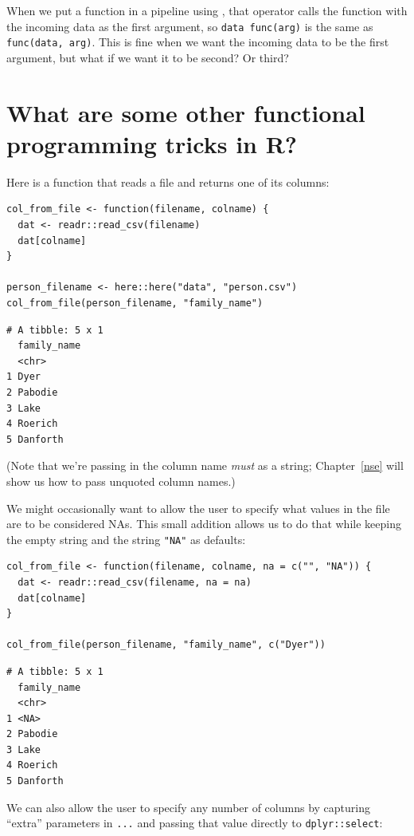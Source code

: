When we put a function in a pipeline using \texttt{\pipe},
that operator calls the function with the incoming data as the first argument,
so \texttt{data {\pipe} func(arg)} is the same as \texttt{func(data, arg)}.
This is fine when we want the incoming data to be the first argument,
but what if we want it to be second? Or third?

\section{What are some other functional programming tricks in R?}\label{debt-functional}

Here is a function that reads a file and returns one of its columns:

\begin{lstlisting}
col_from_file <- function(filename, colname) {
  dat <- readr::read_csv(filename)
  dat[colname]
}

person_filename <- here::here("data", "person.csv")
col_from_file(person_filename, "family_name")
\end{lstlisting}

\begin{lstlisting}
# A tibble: 5 x 1
  family_name
  <chr>      
1 Dyer       
2 Pabodie    
3 Lake       
4 Roerich    
5 Danforth   
\end{lstlisting}

\noindent
(Note that we're passing in the column name \emph{must} as a string;
Chapter~\ref{nse} will show us how to pass unquoted column names.)

We might occasionally want to allow the user to specify
what values in the file are to be considered NAs.
This small addition allows us to do that
while keeping the empty string and the string \texttt{"NA"} as defaults:

\begin{lstlisting}
col_from_file <- function(filename, colname, na = c("", "NA")) {
  dat <- readr::read_csv(filename, na = na)
  dat[colname]
}

col_from_file(person_filename, "family_name", c("Dyer"))
\end{lstlisting}

\begin{lstlisting}
# A tibble: 5 x 1
  family_name
  <chr>      
1 <NA>       
2 Pabodie    
3 Lake       
4 Roerich    
5 Danforth   
\end{lstlisting}

We can also allow the user to specify any number of columns
by capturing ``extra'' parameters in \texttt{...}
and passing that value directly to \texttt{dplyr::select}:

